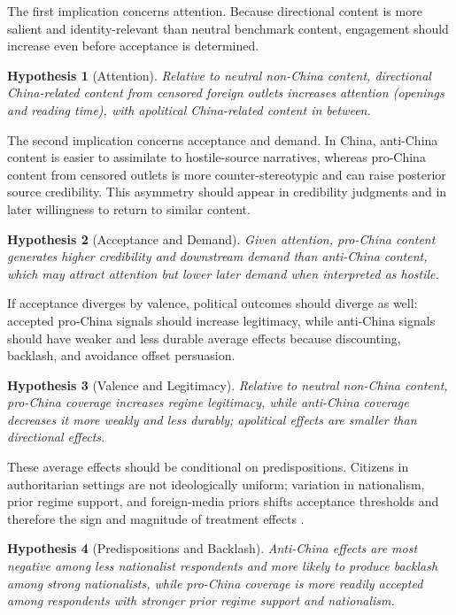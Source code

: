 \documentclass[12pt,american]{article}
\newtheorem{hypothesis}{Hypothesis}
\begin{document}
The first implication concerns attention. Because directional content is more salient and identity-relevant than neutral benchmark content, engagement should increase even before acceptance is determined.
\begin{singlespace}
\begin{hypothesis}[Attention]
Relative to neutral non-China content, directional China-related content from censored foreign outlets increases attention (openings and reading time), with apolitical China-related content in between.
\end{hypothesis}
\end{singlespace}

The second implication concerns acceptance and demand. In China, anti-China content is easier to assimilate to hostile-source narratives, whereas pro-China content from censored outlets is more counter-stereotypic and can raise posterior source credibility. This asymmetry should appear in credibility judgments and in later willingness to return to similar content.
\begin{singlespace}
\begin{hypothesis}[Acceptance and Demand]
Given attention, pro-China content generates higher credibility and downstream demand than anti-China content, which may attract attention but lower later demand when interpreted as hostile.
\end{hypothesis}
\end{singlespace}

If acceptance diverges by valence, political outcomes should diverge as well: accepted pro-China signals should increase legitimacy, while anti-China signals should have weaker and less durable average effects because discounting, backlash, and avoidance offset persuasion.
\begin{singlespace}
\begin{hypothesis}[Valence and Legitimacy]
Relative to neutral non-China content, pro-China coverage increases regime legitimacy, while anti-China coverage decreases it more weakly and less durably; apolitical effects are smaller than directional effects.
\end{hypothesis}
\end{singlespace}

These average effects should be conditional on predispositions. Citizens in authoritarian settings are not ideologically uniform; variation in nationalism, prior regime support, and foreign-media priors shifts acceptance thresholds and therefore the sign and magnitude of treatment effects \citep{Kuran1995,PanSiegel2020APSR,wangwestwood2024}.
\begin{singlespace}
\begin{hypothesis}[Predispositions and Backlash]
Anti-China effects are most negative among less nationalist respondents and more likely to produce backlash among strong nationalists, while pro-China coverage is more readily accepted among respondents with stronger prior regime support and nationalism.
\end{hypothesis}
\end{singlespace}
\end{document}
